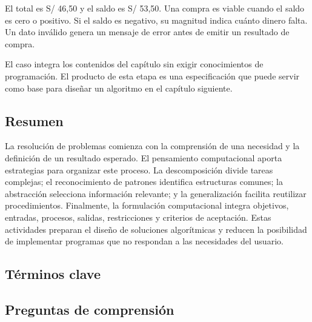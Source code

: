 El total es S/ 46,50 y el saldo es S/ 53,50. Una compra es viable cuando el saldo es cero o positivo. Si el saldo es negativo, su magnitud indica cuánto dinero falta. Un dato inválido genera un mensaje de error antes de emitir un resultado de compra.



El caso integra los contenidos del capítulo sin exigir conocimientos de programación. El producto de esta etapa es una especificación que puede servir como base para diseñar un algoritmo en el capítulo siguiente.


\subsection{Resumen}

La resolución de problemas comienza con la comprensión de una necesidad y la definición de un resultado esperado. El pensamiento computacional aporta estrategias para organizar este proceso. La descomposición divide tareas complejas; el reconocimiento de patrones identifica estructuras comunes; la abstracción selecciona información relevante; y la generalización facilita reutilizar procedimientos. Finalmente, la formulación computacional integra objetivos, entradas, procesos, salidas, restricciones y criterios de aceptación. Estas actividades preparan el diseño de soluciones algorítmicas y reducen la posibilidad de implementar programas que no respondan a las necesidades del usuario.

\subsection{Términos clave}



\subsection{Preguntas de comprensión}

